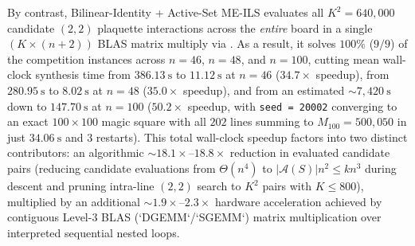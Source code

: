 By contrast, Bilinear-Identity + Active-Set ME-ILS evaluates all $K^2 = 640{,}000$ candidate $(2,2)$ plaquette interactions across the \emph{entire} board in a single $(K \times (n+2))$ BLAS matrix multiply via . As a result, it solves $100\%$ ($9/9$) of the competition instances across $n = 46$, $n = 48$, and $n = 100$, cutting mean wall-clock synthesis time from $386.13~\text{s}$ to $11.12~\text{s}$ at $n = 46$ ($34.7\times$ speedup), from $280.95~\text{s}$ to $8.02~\text{s}$ at $n = 48$ ($35.0\times$ speedup), and from an estimated $\sim 7{,}420~\text{s}$ down to $147.70~\text{s}$ at $n = 100$ ($50.2\times$ speedup, with \texttt{seed = 20002} converging to an exact $100\times 100$ magic square with all $202$ lines summing to $M_{100} = 500{,}050$ in just $34.06~\text{s}$ and $3$ restarts). This total wall-clock speedup factors into two distinct contributors: an algorithmic $\sim 18.1\times\text{--}18.8\times$ reduction in evaluated candidate pairs (reducing candidate evaluations from $\Theta(n^4)$ to $|\mathcal{A}(S)|n^2 \le k n^3$ during descent and pruning intra-line $(2,2)$ search to $K^2$ pairs with $K \le 800$), multiplied by an additional $\sim 1.9\times\text{--}2.3\times$ hardware acceleration achieved by contiguous Level-3 BLAS (`DGEMM`/`SGEMM`) matrix multiplication over interpreted sequential nested loops.
